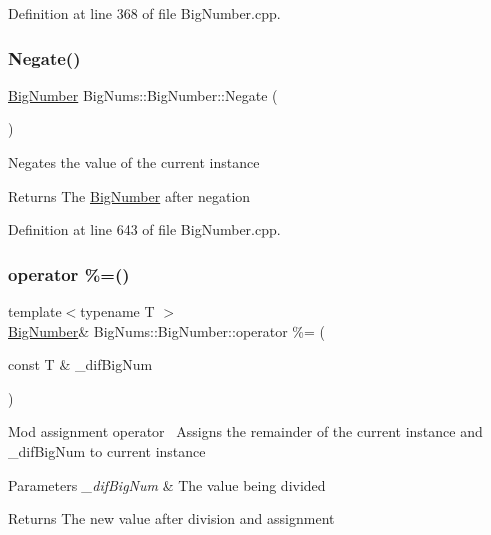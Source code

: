 Definition at line 368 of file Big\+Number.\+cpp.

\mbox{\label{class_big_nums_1_1_big_number_a9f52fbb5f431c7d6a82e40f34e5b1f6e}} 
\subsubsection{\texorpdfstring{Negate()}{Negate()}}
{\footnotesize\ttfamily \mbox{\hyperlink{class_big_nums_1_1_big_number}{Big\+Number}} Big\+Nums\+::\+Big\+Number\+::\+Negate (\begin{DoxyParamCaption}{ }\end{DoxyParamCaption})}

Negates the value of the current instance \begin{DoxyReturn}{Returns}
The \mbox{\hyperlink{class_big_nums_1_1_big_number}{Big\+Number}} after negation 
\end{DoxyReturn}


Definition at line 643 of file Big\+Number.\+cpp.

\mbox{\label{class_big_nums_1_1_big_number_a697d3b997151dcb9e0fe10e5ac44676a}} 
\subsubsection{\texorpdfstring{operator \%=()}{operator \%=()}}
{\footnotesize\ttfamily template$<$typename T $>$ \\
\mbox{\hyperlink{class_big_nums_1_1_big_number}{Big\+Number}}\& Big\+Nums\+::\+Big\+Number\+::operator \%= (\begin{DoxyParamCaption}\item[{const T \&}]{\+\_\+dif\+Big\+Num }\end{DoxyParamCaption})\hspace{0.3cm}{\ttfamily [inline]}}

Mod assignment operator~\newline
Assigns the remainder of the current instance and \+\_\+dif\+Big\+Num to current instance 
\begin{DoxyParams}{Parameters}
{\em \+\_\+dif\+Big\+Num} & The value being divided \\
\hline
\end{DoxyParams}
\begin{DoxyReturn}{Returns}
The new value after division and assignment 
\end{DoxyReturn}


